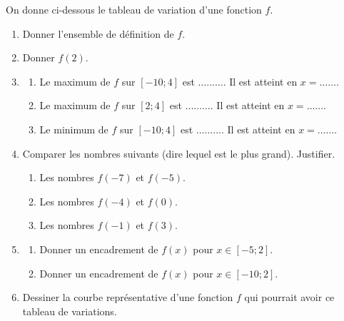\documentclass[11pt]{article}
\begin{document}
\begin{app}
  On donne ci-dessous le tableau de variation d'une fonction $f$.
  \begin{center}
  \end{center}
  \begin{enumerate}
    \item Donner l'ensemble de définition de $f$.
    \item Donner $f(2)$.
    \item \begin{enumerate}
        \item Le maximum de $f$ sur $[-10;4]$ est $\dots\dots\dots$. Il est
          atteint en $x=\dots\dots$.
        \item Le maximum de $f$ sur $[2;4]$ est $\dots\dots\dots$. Il est
          atteint en $x=\dots\dots$.
        \item Le minimum de $f$ sur $[-10;4]$ est $\dots\dots\dots$. Il est
          atteint en $x=\dots\dots$.
      \end{enumerate}
    \item Comparer les nombres suivants (dire lequel est le plus grand). Justifier.
      \begin{enumerate}
        \item Les nombres $f(-7)$ et $f(-5)$.
        \item Les nombres $f(-4)$ et $f(0)$.
        \item Les nombres $f(-1)$ et $f(3)$.
      \end{enumerate}
    \item 
      \begin{enumerate}
        \item Donner un encadrement de $f(x)$ pour $x\in[-5;2]$.
        \item Donner un encadrement de $f(x)$ pour $x\in[-10;2]$.
      \end{enumerate}
    \item Dessiner la courbe représentative d'une fonction $f$ qui pourrait
      avoir ce tableau de variations.
  \end{enumerate}
\end{app}



\end{document}
